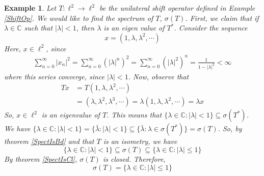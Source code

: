 \documentclass{report}
\newtheorem{exm}{Example}
\begin{document}
\begin{exm}
  Let $T:\ell^{2}\to\ell^{2}$ be the unilateral shift operator defined in Example \ref{ShiftOp}. We would like to find the spectrum of $T$, $\sigma(T)$. First, we claim that if $\lambda\in\mathbb{C}$ such that $|\lambda|<1$, then $\lambda$ is an eigen value of $T^{*}$. Consider the sequence
  $$
  x = (1,\lambda,\lambda^{2},\cdots)
  $$
  Here, $x\in\ell^{2}$, since
  $$
  \begin{aligned}
    \sum^{\infty}_{n=0}|x_{n}|^{2} = \sum^{\infty}_{n=0}(|\lambda|^{n})^{2} = \sum^{\infty}_{n=0}(|\lambda|^{2})^{n} = \frac{1}{1-|\lambda|^{2}} < \infty
  \end{aligned}
  $$
  where this series converge, since $|\lambda|<1$. Now, observe that
  $$
  \begin{aligned}
    Tx &= T(1,\lambda,\lambda^{2},\cdots) \\
       &= (\lambda,\lambda^{2},\lambda^{3},\cdots) = \lambda(1,\lambda,\lambda^{2},\cdots) = \lambda x
  \end{aligned}
  $$
  So, $x\in\ell^{2}$ is an eigenvalue of $T$. This means that $\{\lambda\in\mathbb{C}:|\lambda|<1\}\subseteq\sigma(T^{*})$. We have $\{\lambda\in\mathbb{C}:|\lambda|<1\}=\{\bar{\lambda}:|\lambda|<1\}\subseteq\{\bar{\lambda}:\lambda\in\sigma(T^{*})\}=\sigma(T)$. So, by theorem \ref{SpectIsBd} and that $T$ is an isometry, we have
  $$
  \{\lambda\in\mathbb{C}:|\lambda|<1\}\subseteq\sigma(T)\subseteq\{\lambda\in\mathbb{C}:|\lambda|\leq 1\}
  $$
  By theorem \ref{SpectIsCl}, $\sigma(T)$ is closed. Therefore,
  $$
  \sigma(T)=\{\lambda\in\mathbb{C}:|\lambda|\leq 1\}
  $$
\end{exm}
\end{document}
